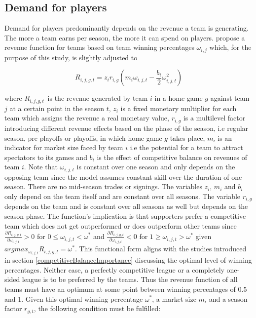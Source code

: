 \documentclass[12pt, a4paper]{article}
\begin{document}
\subsection{Demand for players}

Demand for players predominantly depends on the revenue a team is generating. The more a team earns per season, the more it can spend on players. \citet{dietl_competitive_2011} propose a revenue function for teams based on team winning percentages $\omega_{i,j}$ which, for the purpose of this study, is slightly adjusted to

\begin{equation}
\label{eq:gameRevenue}
R_{i,j,g,t}=z_ir_{i,g}(m_i\omega_{i,j,t}-\frac{b_i}{2}\omega_{i,j,t}^2)
\end{equation}

\noindent
where $R_{i,j,g,t\ }$ is the revenue generated by team $i$ in a home game $g$ against team $j$ at a certain point in the season $t$, $z_i$ is a fixed monetary multiplier for each team which assigns the revenue a real monetary value, $r_{i,g}$ is a multilevel factor introducing different revenue effects based on the phase of the season, i.e regular season, pre-playoffs or playoffs, in which home game $g$ takes place, $m_i$ is an indicator for market size faced by team $i$ i.e the potential for a team to attract spectators to its games and $b_i$ is the effect of competitive balance on revenues of team $i$. Note that $\omega_{i,j,t}$ is constant over one season and only depends on the opposing team since the model assumes constant skill over the duration of one season. There are no mid-season trades or signings. The variables $z_i$, $m_i$ and $b_i$ only depend on the team itself and are constant over all seasons. The variable $r_{i,g}$ depends on the team and is constant over all seasons as well but depends on the season phase. The function's implication is that supporters prefer a competitive team which does not get outperformed or does outperform other teams since $\frac{\partial R_{i,j,g,t}}{\partial\omega_{i,j,t}}>0$ for ${0\le\omega_{i,j,t}<\omega}^\ast$ and $\frac{\partial R_{i,j,g,t}}{\partial\omega_{i,j,t}}<0$ for $1\geq{\omega_{i,j,t}>\omega}^\ast$ given $argmax_{\omega_{i, j ,t}}  R_{i,j,g,t} = \omega^\ast$. This functional form aligns with the studies introduced in section \ref{competitiveBalanceImportance} discussing the optimal level of winning percentages. Neither case, a perfectly competitive league or a completely one-sided league is to be preferred by the teams. Thus the revenue function of all teams must have an optimum at some point between winning percentages of 0.5 and 1. Given this optimal winning percentage $\omega^\ast$, a market size $m_i$ and a season factor $r_{g,t}$, the following condition must be fulfilled:
\end{document}
